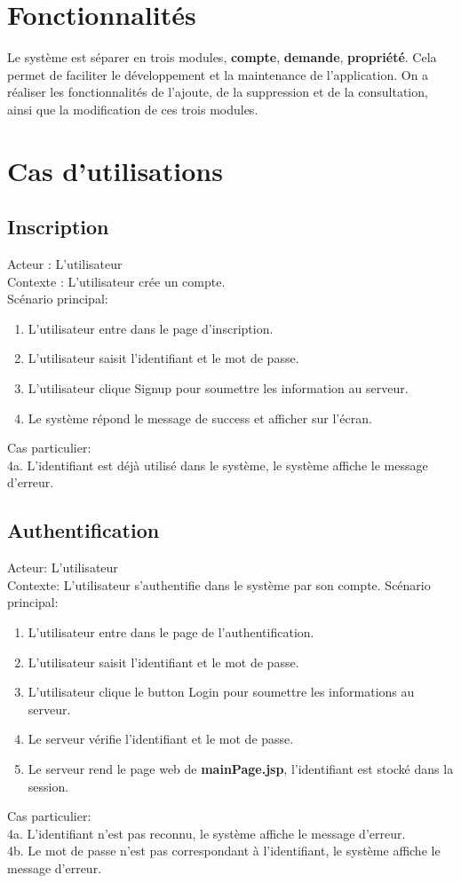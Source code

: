 \documentclass[14px]{article}
\begin{document}
\section{Fonctionnalités}
Le système est séparer en trois modules, \textbf{compte}, \textbf{demande}, \textbf{propriété}. Cela permet de faciliter le développement et la maintenance de l'application. On a réaliser les fonctionnalités de l'ajoute, de la suppression et de la consultation, ainsi que la modification de ces trois modules.

\section{Cas d'utilisations}
\subsection{Inscription}
Acteur : L'utilisateur\\
Contexte : L'utilisateur crée un compte.\\
Scénario principal:
\begin{enumerate}
	\item L'utilisateur entre dans le page d'inscription.
	\item L'utilisateur saisit l'identifiant et le mot de passe.
	\item L'utilisateur clique Signup pour soumettre les information au serveur.
	\item Le système répond le message de success et afficher sur l'écran.
\end{enumerate}
Cas particulier:\\
4a. L'identifiant est déjà utilisé dans le système, le système affiche le message d'erreur.

\subsection{Authentification}
Acteur: L'utilisateur\\
Contexte: L'utilisateur s'authentifie dans le système par son compte.
Scénario principal:
\begin{enumerate}
	\item L'utilisateur entre dans le page de l'authentification.
	\item L'utilisateur saisit l'identifiant et le mot de passe.
	\item L'utilisateur clique le button Login pour soumettre les informations au serveur.
	\item Le serveur vérifie l'identifiant et le mot de passe.
	\item Le serveur rend le page web de \textbf{mainPage.jsp}, l'identifiant est stocké dans la session.
\end{enumerate}
Cas particulier: \\
4a. L'identifiant n'est pas reconnu, le système affiche le message d'erreur.\\
4b. Le mot de passe n'est pas correspondant à l'identifiant, le système affiche le message d'erreur.
\end{document}
